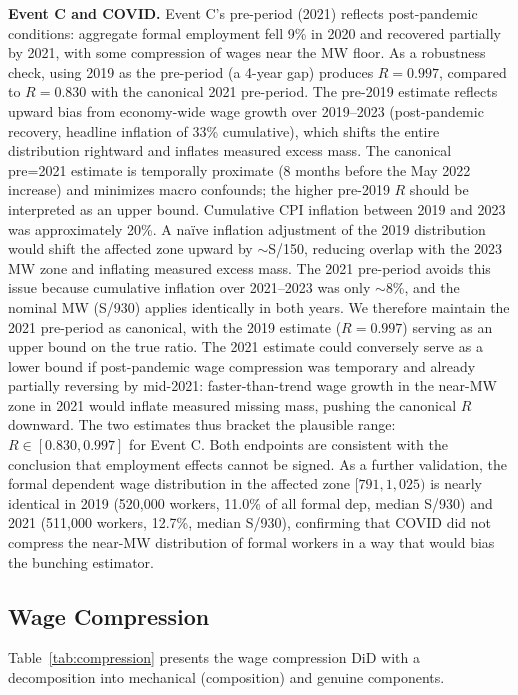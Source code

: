 \documentclass[12pt]{article}
\begin{document}
\textbf{Event C and COVID.} Event C's pre-period (2021) reflects post-pandemic conditions: aggregate formal employment fell 9\% in 2020 and recovered partially by 2021, with some compression of wages near the MW floor. As a robustness check, using 2019 as the pre-period (a 4-year gap) produces $R = 0.997$, compared to $R = 0.830$ with the canonical 2021 pre-period. The pre-2019 estimate reflects upward bias from economy-wide wage growth over 2019--2023 (post-pandemic recovery, headline inflation of 33\% cumulative), which shifts the entire distribution rightward and inflates measured excess mass. The canonical pre=2021 estimate is temporally proximate (8 months before the May 2022 increase) and minimizes macro confounds; the higher pre-2019 $R$ should be interpreted as an upper bound. Cumulative CPI inflation between 2019 and 2023 was approximately 20\%. A na\"ive inflation adjustment of the 2019 distribution would shift the affected zone upward by $\sim$S/150, reducing overlap with the 2023 MW zone and inflating measured excess mass. The 2021 pre-period avoids this issue because cumulative inflation over 2021--2023 was only $\sim$8\%, and the nominal MW (S/930) applies identically in both years. We therefore maintain the 2021 pre-period as canonical, with the 2019 estimate ($R = 0.997$) serving as an upper bound on the true ratio. The 2021 estimate could conversely serve as a lower bound if post-pandemic wage compression was temporary and already partially reversing by mid-2021: faster-than-trend wage growth in the near-MW zone in 2021 would inflate measured missing mass, pushing the canonical $R$ downward. The two estimates thus bracket the plausible range: $R \in [0.830, 0.997]$ for Event C. Both endpoints are consistent with the conclusion that employment effects cannot be signed. As a further validation, the formal dependent wage distribution in the affected zone $[791, 1{,}025)$ is nearly identical in 2019 (520,000 workers, 11.0\% of all formal dep, median S/930) and 2021 (511,000 workers, 12.7\%, median S/930), confirming that COVID did not compress the near-MW distribution of formal workers in a way that would bias the bunching estimator.

\subsection{Wage Compression}

Table~\ref{tab:compression} presents the wage compression DiD with a decomposition into mechanical (composition) and genuine components.
\end{document}

